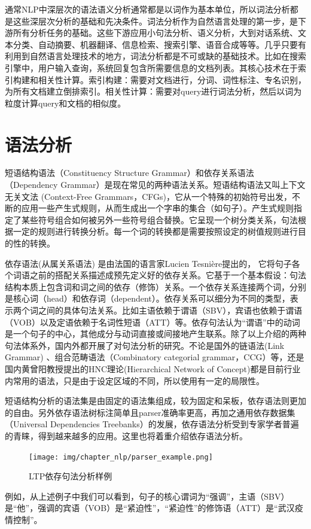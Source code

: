\documentclass[graybox,envcountchap,sectrefs]{svmono}
\begin{document}
通常NLP中深层次的语法语义分析通常都是以词作为基本单位，所以词法分析都是这些深层次分析的基础和先决条件。词法分析作为自然语言处理的第一步，是下游所有分析任务的基础。这些下游应用小句法分析、语义分析，大到对话系统、文本分类、自动摘要、机器翻译\cite{chang2008optimizing}、信息检索、搜索引擎、语音合成等等。几乎只要有利用到自然语言处理技术的地方，词法分析都是不可或缺的基础技术。比如在搜索引擎中，用户输入查询，系统回复包含所需要信息的文档列表。其核心技术在于索引构建和相关性计算。索引构建：需要对文档进行，分词、词性标注、专名识别，为所有文档建立倒排索引。相关性计算：需要对query进行词法分析，然后以词为粒度计算query和文档的相似度。


\section{语法分析}

短语结构语法（Constituency Structure Grammar）和依存关系语法（Dependency Grammar）是现在常见的两种语法关系。短语结构语法又叫上下文无关文法 (Context-Free Grammars，CFGs)，它从一个特殊的初始符号出发，不断的应用一些产生式规则，从而生成出一个字串的集合（如句子）。产生式规则指定了某些符号组合如何被另外一些符号组合替换。它呈现一个树分类关系，句法根据一定的规则进行转换分析。每一个词的转换都是需要按照设定的树值规则进行目的性的转换。

依存语法(从属关系语法) 是由法国的语言家Lucien Tesnière提出的\cite{tesniere1959elements}，
它将句子各个词语之前的搭配关系描述成预先定义好的依存关系。它基于一个基本假设：句法结构本质上包含词和词之间的依存（修饰）关系。一个依存关系连接两个词，分别是核心词（head）和依存词（dependent）。依存关系可以细分为不同的类型，表示两个词之间的具体句法关系。比如主语依赖于谓语（SBV），宾语也依赖于谓语（VOB）以及定语依赖于名词性短语（ATT）等。依存句法认为“谓语”中的动词是一个句子的中心，其他成分与动词直接或间接地产生联系。除了以上介绍的两种句法体系外，国内外都开展了对句法分析的研究。不论是国外的链语法(Link Grammar) 、组合范畴语法（Combinatory categorial grammar，CCG）等，还是国内黄曾阳教授提出的HNC理论(Hierarchical Network of Concept)\cite{黄曾阳:12}都是目前行业内常用的语法，只是由于设定区域的不同，所以使用有一定的局限性。

短语结构分析的语法集是由固定的语法集组成，较为固定和呆板，依存语法则更加的自由。另外依存语法树标注简单且parser准确率更高，再加之通用依存数据集（Universal Dependencies Treebanks）的发展，依存语法分析受到专家学者普遍的青睐，得到越来越多的应用。这里也将着重介绍依存语法分析。

\begin{figure}[h]
\centering
\texttt{[image: img/chapter\_nlp/parser\_example.png]}
\caption{LTP依存句法分析样例}
\label{fig:parserexample}
\end{figure}
例如，从上述例子中我们可以看到，句子的核心谓词为“强调”，主语（SBV）是“他”，强调的宾语（VOB）是“紧迫性”，“紧迫性”的修饰语（ATT）是“武汉疫情控制”。
\end{document}
